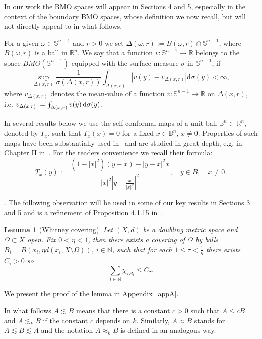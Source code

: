 \documentclass[11pt,a4paper,reqno]{amsart}
\newtheorem{lem}[theorem]{Lemma}
\theoremstyle{definition}
\def\vint{\mathop{\mathchoice%
          {\setbox0\hbox{$\displaystyle\intop$}\kern 0.22\wd0%
           \vcenter{\hrule width 0.6\wd0}\kern -0.82\wd0}%
          {\setbox0\hbox{$\textstyle\intop$}\kern 0.2\wd0%
           \vcenter{\hrule width 0.6\wd0}\kern -0.8\wd0}%
          {\setbox0\hbox{$\scriptstyle\intop$}\kern 0.2\wd0%
           \vcenter{\hrule width 0.6\wd0}\kern -0.8\wd0}%
          {\setbox0\hbox{$\scriptscriptstyle\intop$}\kern 0.2\wd0%
           \vcenter{\hrule width 0.6\wd0}\kern -0.8\wd0}}%
          \mathopen{}\int}
\newcommand{\om}{\omega}
\newcommand{\B}{\mathbb{B}^n}
\newcommand{\N}{\mathbb{N}}
\newcommand{\R}{\mathbb{R}}
\newcommand{\Rn}{{\mathbb R}^n}
\newcommand{\ud}{\mathrm {d}}
\newcommand{\Sn}{\mathbb{S}^{n-1}}
\numberwithin{komcounter}{section}
\begin{document}
In our work the BMO spaces will appear in Sections 4 and 5, especially in the context of the boundary BMO spaces, whose definition we now recall, but will not directly appeal to in what follows.

For a given $\om\in\Sn$ and $r>0$ we set $\Delta(\om,r):=B(\om,r)\cap \Sn$, where $B(\om, r)$ is a ball in $\Rn$.  We say that a function $v:\Sn \to \R$ belongs to the space $BMO(\Sn)$ equipped with the surface measure $\sigma$ in $\Sn$, if 
\begin{equation*}%
\sup_{\Delta(x,r)}\frac{1}{\sigma(\Delta(x,r))}\int_{\Delta(x,r)}|v(y)-v_{\Delta(x,r)}|\ud \sigma(y)<\infty,
\end{equation*}
where $v_{\Delta(x,r)}$ denotes the mean-value of a function $v:\Sn \to\R$ on $\Delta(x,r)$, i.e. $v_{\Delta(x,r)}:=\vint_{\Delta(x,r)} v(y)\,\ud \sigma(y)$.
\smallskip

 In several results below we use the self-conformal maps of a unit ball $\B\subset \R^n$, denoted by $T_x$, such that $T_x(x)=0$ for a fixed $x\in \B$, $x\not=0$. Properties of such maps have been substantially used in~\cite{ak, ag2, z} and are studied in great depth, e.g. in Chapter II in~\cite{ahl}. For the readers convenience we recall their formula: 
\begin{equation}\label{def:Tx}
T_x(y):=\frac{(1-|x|^2)(y-x)-|y-x|^2x}{|x|^2\left|y-\frac{x}{|x|^2}\right|^2},\quad y\in B,\quad x\not=0.
\end{equation}	
\smallskip

. The following observation will be used in some of our key results in Sections 3 and 5 and is a refinement of Proposition 4.1.15 in~\cite{hkst}. 

\begin{lem}[Whitney covering]\label{lem:WhitneyCovering}
 Let $(X,d)$ be a doubling metric space and $\Omega\subset X$ open. Fix $0<\eta <1$, then there exists a covering of $\Omega$ by balls $B_i=B(x_i, \eta d(x_i,X\setminus\Omega ))$, $i\in\N$, such that for each $1\leq \tau <\frac{1}{\eta}$ there exists $C_\tau >0$ so
  $$
  \sum_{i\in\N} \chi_{\tau B_i}\leq C_\tau.
  $$
\end{lem}

We present the proof of the lemma in Appendix~\ref{appA}.

\smallskip

 In what follows $A \lesssim B$ means that there is a constant $c>0$ such that $A\leq cB$ and $A\lesssim_kB$ if the constant $c$ depends on $k$. Similarly, $A\approx B$ stands for $A\lesssim B \lesssim A$ and the notation $A\approx_k B$ is defined in an analogous way.
\end{document}
